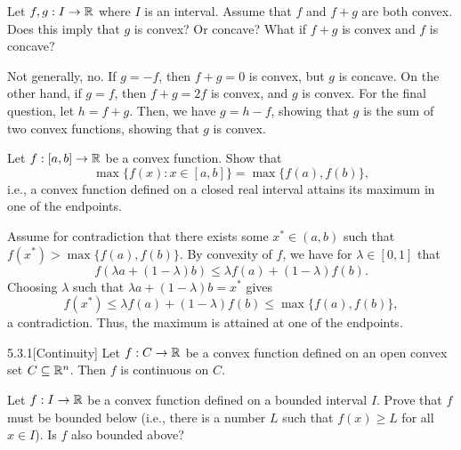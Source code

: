 \begin{exercise}
  Let $f, g : I \to \mathbb{R}$ where $I$ is an interval.
  Assume that $f$ and $f + g$ are both convex.
  Does this imply that $g$ is convex?
  Or concave?
  What if $f + g$ is convex and $f$ is concave?
\end{exercise}

\begin{solution}
  Not generally, no.
  If $g = -f$, then $f + g = 0$ is convex, but $g$ is concave.
  On the other hand, if $g = f$, then $f + g = 2f$ is convex, and $g$ is convex.
  For the final question, let $h = f + g$.
  Then, we have $g = h - f$, showing that $g$ is the sum of two convex functions, showing that $g$ is convex.
\end{solution}

\begin{exercise}\label{ex:5.18}
  Let $f : [a, b] \to \mathbb{R}$ be a convex function.
  Show that
  \begin{equation}
    \max\{ f(x) : x \in [a, b] \} = \max\{ f(a), f(b) \},
  \end{equation}
  i.e., a convex function defined on a closed real interval attains its maximum in one of the endpoints.
\end{exercise}

\begin{solution}
  Assume for contradiction that there exists some $x^* \in (a, b)$ such that $f(x^*) > \max\{ f(a), f(b) \}$.
  By convexity of $f$, we have for $\lambda \in [0, 1]$ that
  \begin{equation}
    f( \lambda a + (1 - \lambda) b )
    \leq
    \lambda f(a) + (1 - \lambda) f(b).
  \end{equation}
  Choosing $\lambda$ such that $\lambda a + (1 - \lambda) b = x^*$ gives
  \begin{equation}
    f(x^*)
    \leq
    \lambda f(a) + (1 - \lambda) f(b)
    \leq
    \max\{ f(a), f(b) \},
  \end{equation}
  a contradiction.
  Thus, the maximum is attained at one of the endpoints.
\end{solution}

\begin{manualtheorem}{5.3.1}[Continuity]\label{thm:cont}
  Let $f : C \to \mathbb{R}$ be a convex function defined on an open convex set $C \subseteq \mathbb{R}^n$.
  Then $f$ is continuous on $C$.
\end{manualtheorem}

\begin{exercise}
  Let $f : I \to \mathbb{R}$ be a convex function defined on a bounded interval $I$.
  Prove that $f$ must be bounded below (i.e., there is a number $L$ such that $f(x) \geq L$ for all $x \in I$).
  Is $f$ also bounded above?
\end{exercise}

